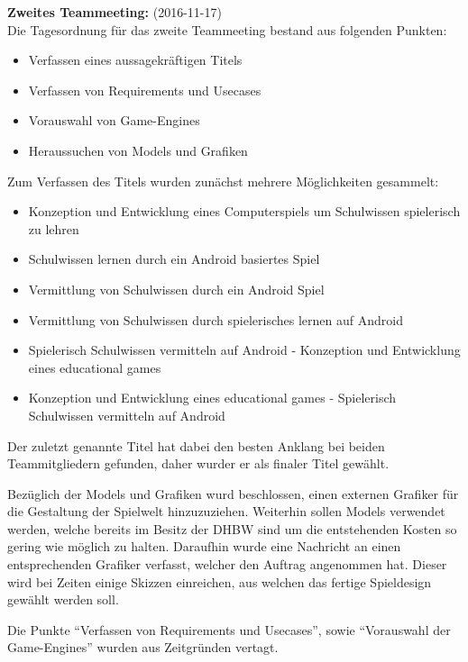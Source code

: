 \textbf{Zweites Teammeeting:} (2016-11-17)\\
Die Tagesordnung für das zweite Teammeeting bestand aus folgenden Punkten:
\begin{itemize}
	\item{Verfassen eines aussagekräftigen Titels}
	\item{Verfassen von Requirements und Usecases}
	\item{Vorauswahl von Game-Engines}
	\item{Heraussuchen von Models und Grafiken}
\end{itemize}

Zum Verfassen des Titels wurden zunächst mehrere Möglichkeiten gesammelt:
\begin{itemize}
	\item{Konzeption und Entwicklung eines Computerspiels um Schulwissen spielerisch zu lehren}
	\item{Schulwissen lernen durch ein Android basiertes Spiel}
	\item{Vermittlung von Schulwissen durch ein Android Spiel}
	\item{Vermittlung von Schulwissen durch spielerisches lernen auf Android}
	\item{Spielerisch Schulwissen vermitteln auf Android - Konzeption und Entwicklung eines educational games}
	\item{Konzeption und Entwicklung eines educational games - Spielerisch Schulwissen vermitteln auf Android}
\end{itemize}
Der zuletzt genannte Titel hat dabei den besten Anklang bei beiden Teammitgliedern gefunden, daher wurder er als finaler Titel gewählt.

Bezüglich der Models und Grafiken wurd beschlossen, einen externen Grafiker für die Gestaltung der Spielwelt hinzuzuziehen. Weiterhin sollen Models verwendet werden, welche bereits im Besitz der DHBW sind um die entstehenden Kosten so gering wie möglich zu halten.
Daraufhin wurde eine Nachricht an einen entsprechenden Grafiker verfasst, welcher den Auftrag angenommen hat. Dieser wird bei Zeiten einige Skizzen einreichen, aus welchen das fertige Spieldesign gewählt werden soll.

Die Punkte \enquote{Verfassen von Requirements und Usecases}, sowie \enquote{Vorauswahl der Game-Engines} wurden aus Zeitgründen vertagt.
